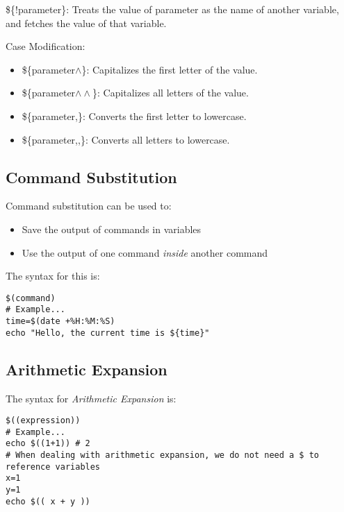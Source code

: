 \documentclass{report}
\begin{document}
    \begin{itemize}
        \$\{!parameter\}: Treats the value of parameter as the name of another variable, and fetches the value of that variable.
    \end{itemize}
    \bigbreak \noindent 
    Case Modification:
    \begin{itemize}
        \item \$\{parameter$\land$\}: Capitalizes the first letter of the value.
        \item \$\{parameter$\land\land$\}: Capitalizes all letters of the value.
        \item \$\{parameter,\}: Converts the first letter to lowercase.
        \item \$\{parameter,,\}: Converts all letters to lowercase.
    \end{itemize}

    \pagebreak \bigbreak \noindent 
    \subsection{Command Substitution}
    \bigbreak \noindent 
    \begin{concept}
		 Command substitution can be used to:
	\end{concept}
    \begin{itemize}
        \item Save the output of commands in variables
        \item Use the output of one command \textit{inside} another command
    \end{itemize}
    \bigbreak \noindent 
    The syntax for this is:
    \begin{mdframed}[style=purplebox]
    \begin{verbatim}
$(command)
# Example...
time=$(date +%H:%M:%S)
echo "Hello, the current time is ${time}"
    \end{verbatim}
    \bigbreak \noindent
    \end{mdframed}

    \bigbreak \noindent 
    \subsection{Arithmetic Expansion}
    \bigbreak \noindent 
    The syntax for \textit{Arithmetic Expansion} is:
    \begin{mdframed}[style=purplebox]
    \begin{verbatim}
$((expression))
# Example...
echo $((1+1)) # 2
# When dealing with arithmetic expansion, we do not need a $ to reference variables
x=1
y=1
echo $(( x + y ))
    \end{verbatim}
    \bigbreak \noindent
    \end{mdframed}
    
\end{document}
